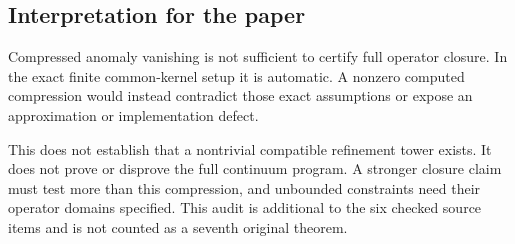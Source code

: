 \subsection{Interpretation for the paper}
Compressed anomaly vanishing is not sufficient to certify full operator closure. In the exact finite common-kernel setup it is automatic. A nonzero computed compression would instead contradict those exact assumptions or expose an approximation or implementation defect.

This does not establish that a nontrivial compatible refinement tower exists. It does not prove or disprove the full continuum program. A stronger closure claim must test more than this compression, and unbounded constraints need their operator domains specified. This audit is additional to the six checked source items and is not counted as a seventh original theorem.



